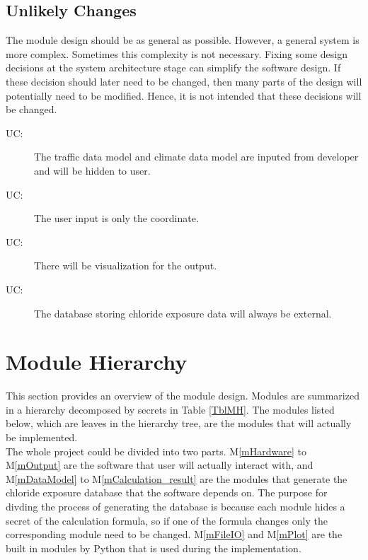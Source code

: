 \documentclass[12pt, titlepage]{article}
\newcounter{ucnum}
\newcommand{\uctheucnum}{UC\theucnum}
\newcommand{\mref}[1]{M\ref{#1}}
\begin{document}
\subsection{Unlikely Changes} \label{SecUchange}

The module design should be as general as possible. However, a general system is
more complex. Sometimes this complexity is not necessary. Fixing some design
decisions at the system architecture stage can simplify the software design. If
these decision should later need to be changed, then many parts of the design
will potentially need to be modified. Hence, it is not intended that these
decisions will be changed.

\begin{description}
\item[ \uctheucnum \label{ucDevInput}:] The traffic data model and climate data model are inputed from developer and will be hidden to user.
\item[ \uctheucnum \label{ucUserInput}:] The user input is only the coordinate.
\item [ \uctheucnum \label{ucOutput}:] There will be visualization for the output.
\item [ \uctheucnum \label{ucDatabase}:] The database storing chloride exposure data will always be external.
\end{description}

\section{Module Hierarchy} \label{SecMH}

This section provides an overview of the module design. Modules are summarized
in a hierarchy decomposed by secrets in Table \ref{TblMH}. The modules listed
below, which are leaves in the hierarchy tree, are the modules that will
actually be implemented.\\
The whole project could be divided into two parts. \mref{mHardware} to \mref{mOutput} are the software that user will actually interact with, and \mref{mDataModel} to \mref{mCalculation_result} are the modules that generate the chloride exposure database that the software depends on. The purpose for divding the process of generating the database is because each module hides a secret of the calculation formula, so if one of the formula changes only the corresponding module need to be changed. \mref{mFileIO} and \mref{mPlot} are the built in modules by Python that is used during the implementation.
\end{document}

